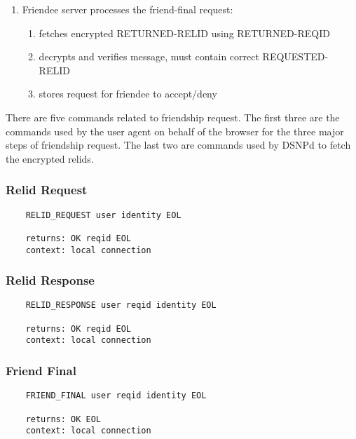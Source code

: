 \documentclass[letterpaper,11pt,oneside]{article}
\begin{document}
\begin{enumerate}
\item Friendee server processes the friend-final request:
    \begin{enumerate}
    \item fetches encrypted RETURNED-RELID using RETURNED-REQID
    \item decrypts and verifies message, must contain correct REQUESTED-RELID
    \item stores request for friendee to accept/deny
    \end{enumerate}
\end{enumerate}

There are five commands related to friendship request. The first three are the
commands used by the user agent on behalf of the browser for the three major
steps of friendship request. The last two are commands used by DSNPd to fetch
the encrypted relids.

\subsubsection{Relid Request}

\vspace{10pt}
\begin{verbatim}
    RELID_REQUEST user identity EOL

    returns: OK reqid EOL
    context: local connection
\end{verbatim}
\vspace{10pt}

\subsubsection{Relid Response}

\vspace{10pt}
\begin{verbatim}
    RELID_RESPONSE user reqid identity EOL

    returns: OK reqid EOL
    context: local connection
\end{verbatim}
\vspace{10pt}

\subsubsection{Friend Final}

\vspace{10pt}
\begin{verbatim}
    FRIEND_FINAL user reqid identity EOL

    returns: OK EOL
    context: local connection
\end{verbatim}
\vspace{10pt}
\end{document}
